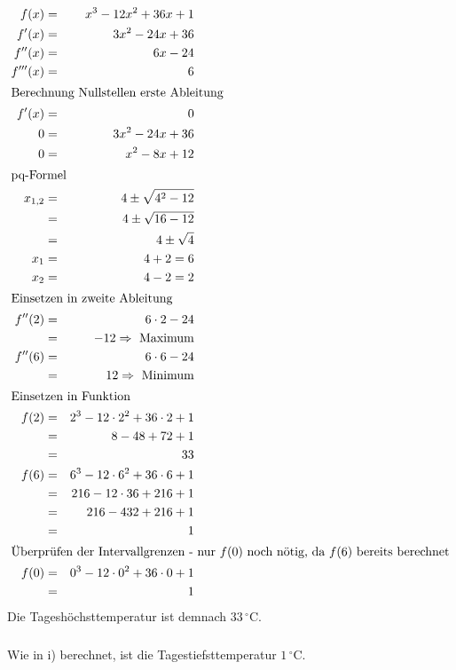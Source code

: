 \documentclass[10pt,a4paper,oneside,ngerman,numbers=noenddot]{scrartcl}
\begin{document}
\section{} %
\setcounter{subsubsection}{0}
\subsubsection{} %
\begin{alignat*}{2}
f(x) &=& x^{3} - 12x^{2} + 36x + 1\\
f'(x) &=& 3x^{2} -24x + 36 \\
f''(x) &=& 6x - 24 \\
f'''(x) &=& 6 \\
\intertext{Berechnung Nullstellen erste Ableitung}
f'(x) &=& 0 \\
0 &=& 3x^{2} - 24x + 36 \\
0 &=& x^{2} - 8x + 12 \\
\intertext{pq-Formel}
x_{1,2} &=& 4 \pm \sqrt{4^{2} -12} \\
&=& 4 \pm \sqrt{16 - 12} \\
&=& 4 \pm \sqrt{4} \\
x_{1} &=& 4 + 2 = 6 \\
x_{2} &=& 4-2 = 2 \\
\intertext{Einsetzen in zweite Ableitung}
f''(2) &=& 6 \cdot 2 - 24 \\
&=& -12 \Rightarrow \text{ Maximum} \\
f''(6) &=& 6 \cdot 6 - 24 \\
&=& 12 \Rightarrow \text{ Minimum} \\
\intertext{Einsetzen in Funktion}
f(2) &=& 2^{3} - 12 \cdot 2^{2} + 36 \cdot 2 + 1 \\
&=& 8 - 48 + 72 + 1 \\
&=& 33 \\
f(6) &=& 6^{3} - 12 \cdot 6^{2} + 36 \cdot 6 + 1 \\
&=& 216 - 12 \cdot 36 + 216 + 1 \\
&=& 216 - 432 + 216 + 1 \\
&=& 1 \\
\intertext{Überprüfen der Intervallgrenzen - nur $f(0)$ noch nötig, da $f(6)$ bereits berechnet}
f(0) &=& 0^{3} - 12 \cdot 0^{2} + 36 \cdot 0 + 1 \\
&=& 1
\end{alignat*}
Die Tageshöchsttemperatur ist demnach $33\,^{\circ} \mathrm{C}$.
\subsubsection{} %
Wie in i) berechnet, ist die Tagestiefsttemperatur $1\,^{\circ} \mathrm{C}$.
\end{document}
